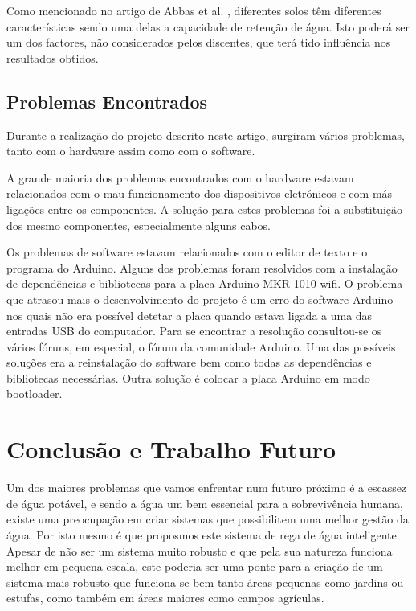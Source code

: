 \documentclass[conference]{IEEEtran}
\begin{document}
Como mencionado no artigo de Abbas et al. \cite{abbas2014smart}, diferentes solos têm diferentes características 
sendo uma delas a capacidade de retenção de água. Isto poderá ser um dos factores, não considerados pelos 
discentes, que terá tido influência nos resultados obtidos.

\subsection{Problemas Encontrados}

Durante a realização do projeto descrito neste artigo, surgiram vários problemas, tanto com o hardware 
assim como com o software.

A grande maioria dos problemas encontrados com o hardware estavam relacionados com o mau funcionamento dos 
dispositivos eletrónicos e com más ligações entre os componentes. A solução para estes problemas foi a 
substituição dos mesmo componentes, especialmente alguns cabos.

Os problemas de software estavam relacionados com o editor de texto e o programa do Arduino. Alguns dos problemas 
foram resolvidos com a instalação de dependências e bibliotecas para a placa Arduino MKR 1010 wifi. 
O problema que atrasou mais o desenvolvimento do projeto é um erro do software Arduino nos quais não era possível 
detetar a placa quando estava ligada a uma das entradas USB do computador. Para se encontrar a resolução 
consultou-se os vários fóruns, em especial, o fórum da comunidade Arduino. Uma das possíveis soluções era a 
reinstalação do software bem como todas as dependências e bibliotecas necessárias. Outra solução é colocar a 
placa Arduino em modo bootloader. \cite{arduinoport}

\section{Conclusão e Trabalho Futuro}

Um dos maiores problemas que vamos enfrentar num futuro próximo é a escassez de água potável,
e sendo a água um bem essencial para a sobrevivência humana, existe uma preocupação 
em criar sistemas que possibilitem uma melhor gestão da água. Por isto mesmo 
é que proposmos este sistema de rega de água inteligente. Apesar de não ser um 
sistema muito robusto e que pela sua natureza funciona melhor em pequena escala, este 
poderia ser uma ponte para a criação de um sistema mais robusto que funciona-se bem 
tanto áreas pequenas como jardins ou estufas, como também em áreas maiores como campos agrículas.
\end{document}
